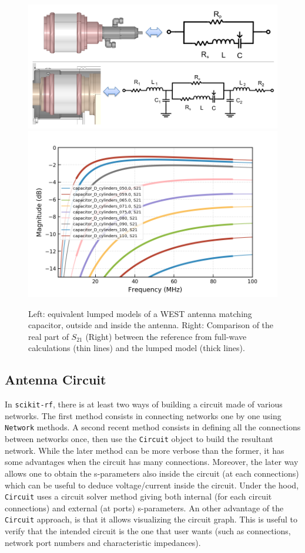 \documentclass{aip-cp}
\begin{document}
\begin{figure}[h]
	\centering
	\includegraphics[width=0.49\linewidth]{figures/capacitor_equivalent_circuit}
	\includegraphics[width=0.49\linewidth]{figures/comparison_fullwave_lumped_S21}
	\caption{Left: equivalent lumped models of a WEST antenna matching capacitor, outside and inside the antenna.
	Right: Comparison of the real part of $S_{21}$ (Right) between the reference from full-wave calculations (thin lines) and the lumped model (thick lines). }
	\label{fig:comparisonfullwavelumpeds}
\end{figure}
 

\subsection{Antenna Circuit}
In \texttt{scikit-rf}, there is at least two ways of building a circuit made of various networks. The first method consists in connecting networks one by one using \texttt{Network} methods. A second recent method consists in defining all the connections between networks once, then use the \texttt{Circuit} object to build the resultant network. While the later method can be more verbose than the former, it has some advantages when the circuit has many connections. Moreover, the later way allows one to obtain the s-parameters also inside the circuit (at each connections) which can be useful to deduce voltage/current inside the circuit. Under the hood, \texttt{Circuit} uses a circuit solver method giving both internal (for each circuit connections) and external (at ports) s-parameters\cite{Hallbjorner2003}. An other advantage of the \texttt{Circuit} approach, is that it allows visualizing the circuit graph. This is useful to verify that the intended circuit is the one that user wants (such as connections, network port numbers and characteristic impedances). 
\end{document}
